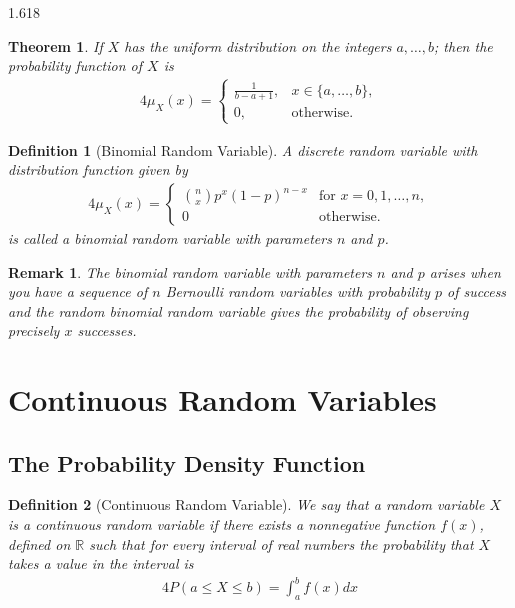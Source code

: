 \documentclass[11pt, oneside]{book}   	%
\newtheorem{definition}{Definition}[chapter]
\newtheorem{remark}{Remark}[chapter]
\newtheorem{theorem}{Theorem}[chapter]
\begin{document}
\begin{spacing}{1.618}
		\begin{theorem}
			If $X$ has the uniform distribution on the integers $a, \dots, b$; then the probability function of $X$ is 
			\begin{alignat}{4}
				\mu_X(x)=\begin{cases}
					\frac{1}{b-a+1}, & x \in \{a, \dots, b\}, \\
					0, & \text{otherwise}.
				\end{cases}
			\end{alignat}
		\end{theorem}
		
		\begin{definition}[Binomial Random Variable]
			A discrete random variable with distribution function given by 
			\begin{alignat}{4}
				\mu_X(x)=\begin{cases}
					\binom{n}{x} p^x(1-p)^{n-x} & \textrm{for $x=0, 1, \dots, n$}, \\
					0 & \textrm{otherwise}.
				\end{cases}
			\end{alignat}
			is called a \emph{binomial random variable} with parameters $n$ and $p$. 
		\end{definition}
		
		\begin{remark}
			The binomial random variable with parameters $n$ and $p$ arises when you have a sequence of $n$ Bernoulli random variables with probability $p$ of success and the random binomial random variable gives the probability of observing precisely $x$ successes. 
		\end{remark}

	\section{Continuous Random Variables}
	
		\subsection{The Probability Density Function}
			
			\begin{definition}[Continuous Random Variable]
				We say that a random variable $X$ is a \emph{continuous random variable} if there exists a nonnegative function $f(x)$, defined on $\mathbb{R}$ such that for every interval of real numbers the probability that $X$ takes a value in the interval is
				\begin{alignat}{4}
					P(a\leq X \leq b)=\int_a^bf(x)dx
				\end{alignat}
			\end{definition}
			

\end{spacing}
\end{document}
